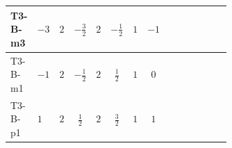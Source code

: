 \documentclass[8pt]{article}
\begin{document}
\begin{landscape}
\begin{longtable}{@{}llcccccc >{\raggedright\arraybackslash}p{0.21\linewidth} >{\raggedright\arraybackslash}p{0.21\linewidth} >{\raggedright\arraybackslash}p{0.21\linewidth}@{}}
\midrule
T3-B-m3 & $-3$ & $2$ & $-\frac{3}{2}$ & $2$ & $-\frac{1}{2}$ & $1$ & $-1$ & \scriptsize\adjustbox{max width=\linewidth}{$\begin{gathered} +4 {\lambda_{HS_2}^{(1)}} {\lambda_5}\end{gathered}$} & \scriptsize\adjustbox{max width=\linewidth}{$\begin{gathered} {\lambda_5} \left(T_{\nu}^{(1)}+T_{\nu}^{(2)}+6 \operatorname{Tr}\!\left({Y_d}\,\left({Y_d}\right)^{\dagger}\right)+2 \operatorname{Tr}\!\left({Y_e}\,\left({Y_e}\right)^{\dagger}\right)+6 \operatorname{Tr}\!\left({Y_u}\,\left({Y_u}\right)^{\dagger}\right)+\frac{{\lambda_{12}^{(A)}}}{6}+\frac{2 {\lambda_{HS_1}^{(A)}}}{3}+2 {\lambda_{HS_2}^{(A)}}\right)\end{gathered}$} & \scriptsize\adjustbox{max width=\linewidth}{$\begin{gathered} -9 {g_2}^2 {\lambda_5}\end{gathered}$} \\
\midrule
T3-B-m1 & $-1$ & $2$ & $-\frac{1}{2}$ & $2$ & $\frac{1}{2}$ & $1$ & $0$ & \scriptsize\adjustbox{max width=\linewidth}{$\begin{gathered} +4 {\lambda_{HS_2}^{(1)}} {\lambda_5}\end{gathered}$} & \scriptsize\adjustbox{max width=\linewidth}{$\begin{gathered} {\lambda_5} \left(T_{\nu}^{(1)}+T_{\nu}^{(2)}+6 \operatorname{Tr}\!\left({Y_d}\,\left({Y_d}\right)^{\dagger}\right)+2 \operatorname{Tr}\!\left({Y_e}\,\left({Y_e}\right)^{\dagger}\right)+6 \operatorname{Tr}\!\left({Y_u}\,\left({Y_u}\right)^{\dagger}\right)+\frac{{\lambda_{12}^{(A)}}}{6}+\frac{2 {\lambda_{HS_1}^{(A)}}}{3}+2 {\lambda_{HS_2}^{(A)}}\right)\end{gathered}$} & \scriptsize\adjustbox{max width=\linewidth}{$\begin{gathered} -9 {g_2}^2 {\lambda_5}\end{gathered}$} \\
\midrule
T3-B-p1 & $1$ & $2$ & $\frac{1}{2}$ & $2$ & $\frac{3}{2}$ & $1$ & $1$ & \scriptsize\adjustbox{max width=\linewidth}{$\begin{gathered} +4 {\lambda_{HS_2}^{(1)}} {\lambda_5}\end{gathered}$} & \scriptsize\adjustbox{max width=\linewidth}{$\begin{gathered} {\lambda_5} \left(T_{\nu}^{(1)}+T_{\nu}^{(2)}+6 \operatorname{Tr}\!\left({Y_d}\,\left({Y_d}\right)^{\dagger}\right)+2 \operatorname{Tr}\!\left({Y_e}\,\left({Y_e}\right)^{\dagger}\right)+6 \operatorname{Tr}\!\left({Y_u}\,\left({Y_u}\right)^{\dagger}\right)+\frac{{\lambda_{12}^{(A)}}}{6}+\frac{2 {\lambda_{HS_1}^{(A)}}}{3}+2 {\lambda_{HS_2}^{(A)}}\right)\end{gathered}$} & \scriptsize\adjustbox{max width=\linewidth}{$\begin{gathered} -9 {g_2}^2 {\lambda_5}\end{gathered}$} \\

\end{longtable}
\end{landscape}
\end{document}
